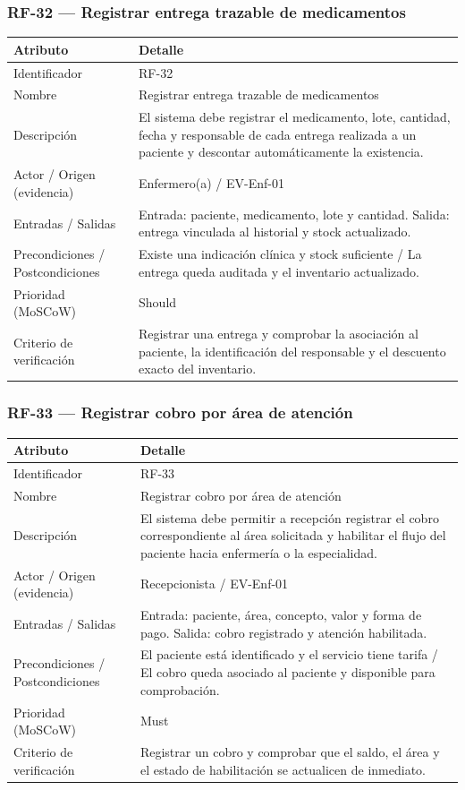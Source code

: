 \documentclass[11pt,a4paper]{article}
\begin{document}
	\subsubsection{RF-32 --- Registrar entrega trazable de medicamentos}
	\begin{longtable}{p{} p{}}
		\toprule
		\textbf{Atributo} & \textbf{Detalle} \\
		\midrule
		\endhead
		Identificador & RF-32 \\
		Nombre & Registrar entrega trazable de medicamentos \\
		Descripción & El sistema debe registrar el medicamento, lote, cantidad, fecha y responsable de cada entrega realizada a un paciente y descontar automáticamente la existencia. \\
		Actor / Origen (evidencia) & Enfermero(a) / EV-Enf-01 \\
		Entradas / Salidas & Entrada: paciente, medicamento, lote y cantidad. Salida: entrega vinculada al historial y stock actualizado. \\
		Precondiciones / Postcondiciones & Existe una indicación clínica y stock suficiente / La entrega queda auditada y el inventario actualizado. \\
		Prioridad (MoSCoW) & Should \\
		Criterio de verificación & Registrar una entrega y comprobar la asociación al paciente, la identificación del responsable y el descuento exacto del inventario. \\
		\bottomrule
	\end{longtable}
	
	\subsubsection{RF-33 --- Registrar cobro por área de atención}
	\begin{longtable}{p{} p{}}
		\toprule
		\textbf{Atributo} & \textbf{Detalle} \\
		\midrule
		\endhead
		Identificador & RF-33 \\
		Nombre & Registrar cobro por área de atención \\
		Descripción & El sistema debe permitir a recepción registrar el cobro correspondiente al área solicitada y habilitar el flujo del paciente hacia enfermería o la especialidad. \\
		Actor / Origen (evidencia) & Recepcionista / EV-Enf-01 \\
		Entradas / Salidas & Entrada: paciente, área, concepto, valor y forma de pago. Salida: cobro registrado y atención habilitada. \\
		Precondiciones / Postcondiciones & El paciente está identificado y el servicio tiene tarifa / El cobro queda asociado al paciente y disponible para comprobación. \\
		Prioridad (MoSCoW) & Must \\
		Criterio de verificación & Registrar un cobro y comprobar que el saldo, el área y el estado de habilitación se actualicen de inmediato. \\
		\bottomrule
	\end{longtable}
	
\end{document}
